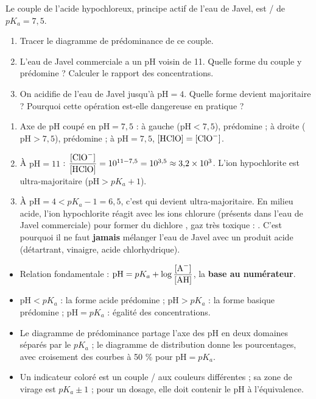 \documentclass[11pt]{article}
\begin{document}
\begin{exercice}
Le couple de l'acide hypochloreux, principe actif de l'eau de Javel, est / de $pK_a = 7,5$.
\begin{enumerate}
\item Tracer le diagramme de prédominance de ce couple.
\item L'eau de Javel commerciale a un pH voisin de 11. Quelle forme du couple y prédomine ? Calculer le rapport des concentrations.
\item On acidifie de l'eau de Javel jusqu'à $\mathrm{pH} = 4$. Quelle forme devient majoritaire ? Pourquoi cette opération est-elle dangereuse en pratique ?
\end{enumerate}
\end{exercice}

\begin{corrige}[Exercice 1]
\begin{enumerate}
\item Axe de pH coupé en $\mathrm{pH} = 7,5$ : à gauche ($\mathrm{pH} < 7,5$),  prédomine ; à droite ($\mathrm{pH} > 7,5$),  prédomine ; à $\mathrm{pH} = 7,5$, $[\ce{HClO}] = [\ce{ClO-}]$.
\item À $\mathrm{pH} = 11$ : $\dfrac{[\ce{ClO-}]}{[\ce{HClO}]} = 10^{11 - 7,5} = 10^{3,5} \approx 3{,}2 \times 10^{3}$. L'ion hypochlorite  est ultra-majoritaire ($\mathrm{pH} > pK_a + 1$).
\item À $\mathrm{pH} = 4 < pK_a - 1 = 6,5$, c'est  qui devient ultra-majoritaire. En milieu acide, l'ion hypochlorite  réagit avec les ions chlorure  (présents dans l'eau de Javel commerciale) pour former du dichlore , gaz très toxique : . C'est pourquoi il ne faut \textbf{jamais} mélanger l'eau de Javel avec un produit acide (détartrant, vinaigre, acide chlorhydrique).
\end{enumerate}
\end{corrige}

\begin{aretenir}
\begin{itemize}
\item Relation fondamentale : $\mathrm{pH} = pK_a + \log\dfrac{[\ce{A-}]}{[\ce{AH}]}$, la \textbf{base au numérateur}.
\item $\mathrm{pH} < pK_a$ : la forme acide prédomine ; $\mathrm{pH} > pK_a$ : la forme basique prédomine ; $\mathrm{pH} = pK_a$ : égalité des concentrations.
\item Le diagramme de prédominance partage l'axe des pH en deux domaines séparés par le $pK_a$ ; le diagramme de distribution donne les pourcentages, avec croisement des courbes à 50 \% pour $\mathrm{pH} = pK_a$.
\item Un indicateur coloré est un couple / aux couleurs différentes ; sa zone de virage est $pK_a \pm 1$ ; pour un dosage, elle doit contenir le pH à l'équivalence.
\end{itemize}
\end{aretenir}
\end{document}
